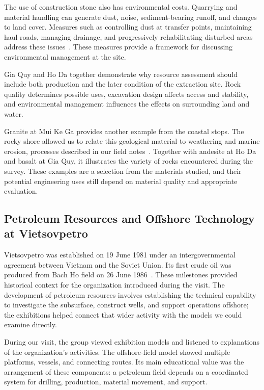 \documentclass[11pt, a4paper]{article}
\begin{document}
The use of construction stone also has environmental costs. Quarrying and material handling can generate dust, noise, sediment-bearing runoff, and changes to land cover. Measures such as controlling dust at transfer points, maintaining haul roads, managing drainage, and progressively rehabilitating disturbed areas address these issues~\cite{quarry-ehs}. These measures provide a framework for discussing environmental management at the site.

Gia Quy and Ho Da together demonstrate why resource assessment should include both production and the later condition of the extraction site. Rock quality determines possible uses, excavation design affects access and stability, and environmental management influences the effects on surrounding land and water.

Granite at Mui Ke Ga provides another example from the coastal stops. The rocky shore allowed us to relate this geological material to weathering and marine erosion, processes described in our field notes~\cite{group-field-notes}. Together with andesite at Ho Da and basalt at Gia Quy, it illustrates the variety of rocks encountered during the survey. These examples are a selection from the materials studied, and their potential engineering uses still depend on material quality and appropriate evaluation.

\subsection{Petroleum Resources and Offshore Technology at Vietsovpetro}

Vietsovpetro was established on 19 June 1981 under an intergovernmental agreement between Vietnam and the Soviet Union. Its first crude oil was produced from Bach Ho field on 26 June 1986~\cite{vietsov-history}. These milestones provided historical context for the organization introduced during the visit. The development of petroleum resources involves establishing the technical capability to investigate the subsurface, construct wells, and support operations offshore; the exhibitions helped connect that wider activity with the models we could examine directly.

During our visit, the group viewed exhibition models and listened to explanations of the organization's activities. The offshore-field model showed multiple platforms, vessels, and connecting routes. Its main educational value was the arrangement of these components: a petroleum field depends on a coordinated system for drilling, production, material movement, and support.
\end{document}
